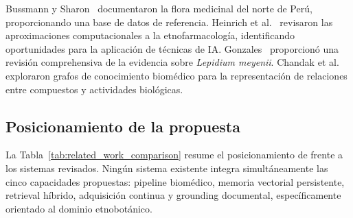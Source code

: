 Bussmann y Sharon~\cite{bussmann2006traditional} documentaron la flora medicinal del norte de Perú, proporcionando una base de datos de referencia. Heinrich et al.~\cite{heinrich2020ethnopharmacology} revisaron las aproximaciones computacionales a la etnofarmacología, identificando oportunidades para la aplicación de técnicas de IA. Gonzales~\cite{gonzales2012ethnobiology} proporcionó una revisión comprehensiva de la evidencia sobre \textit{Lepidium meyenii}. Chandak et al.~\cite{chandak2023building} exploraron grafos de conocimiento biomédico para la representación de relaciones entre compuestos y actividades biológicas.

\subsection{Posicionamiento de la propuesta}
\label{subsec:rw_positioning}

La Tabla~\ref{tab:related_work_comparison} resume el posicionamiento de \sirca{} frente a los sistemas revisados. Ningún sistema existente integra simultáneamente las cinco capacidades propuestas: pipeline \rag{} biomédico, memoria vectorial persistente, retrieval híbrido, adquisición continua y grounding documental, específicamente orientado al dominio etnobotánico.


